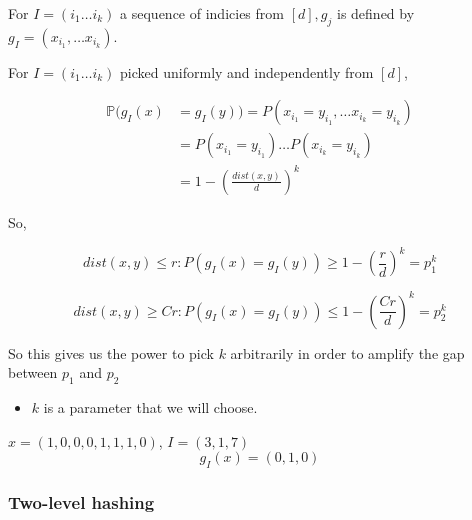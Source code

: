 \documentclass[../notes.tex]{subfiles}
\begin{document}
\begin{definition}
    For $ I = (i_1 \ldots i_k) $ a sequence of indicies from $ \left[ d \right], g_j  $  is defined by $ g_I = (x_{i_1}, \ldots x_{i_k}) $.


    For $ I = (i_1 \ldots i_k) $ picked uniformly and independently from $ \left[ d \right]  $,

    \begin{equation}
        \begin{split}
        \mathbb{P}(g_I(x) &=  g_I(y) ) = P(x_{i_1} = y_{i_1}, \ldots x_{i_k} = y_{i_k})  \\
        &= P(x_{i_1} = y_{i_1}) \ldots P(x_{i_k} = y_{i_{k}}) \\
        &=  1 - \left( \frac{dist(x,y)}{d} \right)^k  
        \end{split}
    \end{equation}

    So,

    \begin{equation}
        dist(x,y) \le  r : P(g_I(x) = g_I(y)) \ge 1 - \left( \frac{r}{d} \right)^k = p_1^k
    \end{equation}

    \begin{equation}
        dist(x,y) \ge  Cr : P(g_I(x) = g_I(y)) \le  1 - \left( \frac{Cr}{d} \right)^k = p_2^k
    \end{equation}

    So this gives us the power to pick $ k $ arbitrarily in order to amplify the gap between $ p_1 $ and $ p_2 $
    \begin{itemize}
        \item $ k $ is a parameter that we will choose.
    \end{itemize}

    \begin{example}
        $ x = (1,0,0,0,1,1,1,0) $, $ I = (3,1,7) $
        \begin{equation}
            g_I(x) = (0,1,0)
        \end{equation}
        
    \end{example}
    

\end{definition}

\subsubsection{Two-level hashing}
\end{document}
